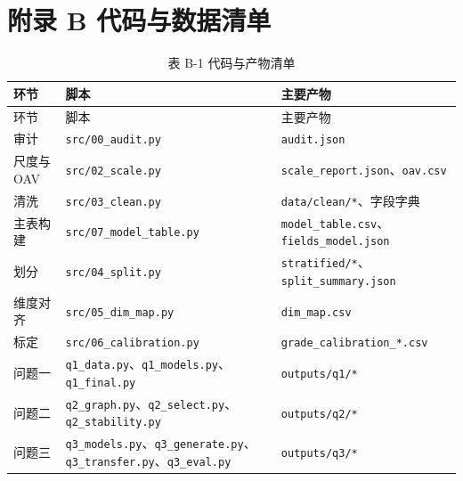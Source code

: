 \documentclass[
  a4paper,12pt]{article}
\begin{document}
\section*{附录 B
代码与数据清单}\label{ux9644ux5f55-b-ux4ee3ux7801ux4e0eux6570ux636eux6e05ux5355}

\begin{longtable}[]{@{}
  >{\raggedright\arraybackslash}p{}
  >{\raggedright\arraybackslash}p{}
  >{\raggedright\arraybackslash}p{}@{}}
\caption{表 B-1 代码与产物清单}\tabularnewline
\toprule\noalign{}
\begin{minipage}[b]{\linewidth}\raggedright
环节
\end{minipage} & \begin{minipage}[b]{\linewidth}\raggedright
脚本
\end{minipage} & \begin{minipage}[b]{\linewidth}\raggedright
主要产物
\end{minipage} \\
\midrule\noalign{}
\endfirsthead
\toprule\noalign{}
\begin{minipage}[b]{\linewidth}\raggedright
环节
\end{minipage} & \begin{minipage}[b]{\linewidth}\raggedright
脚本
\end{minipage} & \begin{minipage}[b]{\linewidth}\raggedright
主要产物
\end{minipage} \\
\midrule\noalign{}
\endhead
\bottomrule\noalign{}
\endlastfoot
审计 & \texttt{src/00\_audit.py} & \texttt{audit.json} \\
尺度与 OAV & \texttt{src/02\_scale.py} &
\texttt{scale\_report.json}、\texttt{oav.csv} \\
清洗 & \texttt{src/03\_clean.py} & \texttt{data/clean/*}、字段字典 \\
主表构建 & \texttt{src/07\_model\_table.py} &
\texttt{model\_table.csv}、\texttt{fields\_model.json} \\
划分 & \texttt{src/04\_split.py} &
\texttt{stratified/*}、\texttt{split\_summary.json} \\
维度对齐 & \texttt{src/05\_dim\_map.py} & \texttt{dim\_map.csv} \\
标定 & \texttt{src/06\_calibration.py} &
\texttt{grade\_calibration\_*.csv} \\
问题一 &
\texttt{q1\_data.py}、\texttt{q1\_models.py}、\texttt{q1\_final.py} &
\texttt{outputs/q1/*} \\
问题二 &
\texttt{q2\_graph.py}、\texttt{q2\_select.py}、\texttt{q2\_stability.py}
& \texttt{outputs/q2/*} \\
问题三 &
\texttt{q3\_models.py}、\texttt{q3\_generate.py}、\texttt{q3\_transfer.py}、\texttt{q3\_eval.py}
& \texttt{outputs/q3/*} \\
\end{longtable}
\end{document}
